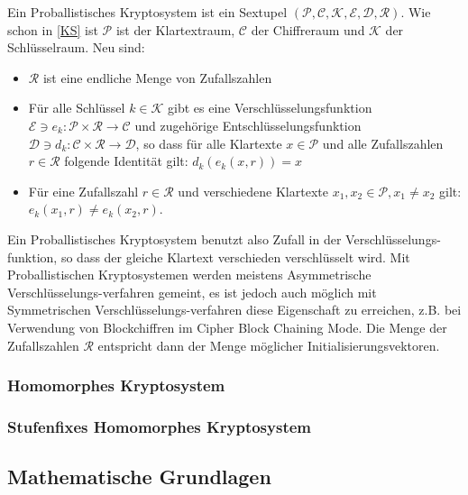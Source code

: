 \begin{theorem}
	\label{PKS}
	Ein Proballistisches Kryptosystem ist ein Sextupel $(\mathcal{P},\mathcal{C},\mathcal{K},\mathcal{E},\mathcal{D},\mathcal{R})$. Wie schon in \ref{KS} ist $\mathcal{P}$ ist der Klartextraum, $\mathcal{C}$ der Chiffreraum und $\mathcal{K}$ der Schlüsselraum. Neu sind:
	\begin{itemize}
		\item $\mathcal{R}$ ist eine endliche Menge von Zufallszahlen
		\item Für alle Schlüssel $k\in \mathcal{K}$ gibt es eine Verschlüsselungsfunktion $\mathcal{E}\ni e_k:\mathcal{P}\times\mathcal{R}\rightarrow\mathcal{C}$ und zugehörige Entschlüsselungsfunktion $\mathcal{D}\ni d_k:\mathcal{C}\times\mathcal{R}\rightarrow\mathcal{D}$, so dass für alle Klartexte $x\in\mathcal{P}$ und alle Zufallszahlen $r\in\mathcal{R}$ folgende Identität gilt: $d_k(e_k(x,r)) = x$ 
		\item Für eine Zufallszahl $r\in\mathcal{R}$ und verschiedene Klartexte $x_1,x_2\in\mathcal{P}, x_1\neq x_2$ gilt: $e_k(x_1,r)\neq e_k(x_2,r)$.
		
	\end{itemize}
\end{theorem}

Ein Proballistisches Kryptosystem benutzt also Zufall in der Verschlüsselungs-funktion, so dass der gleiche Klartext verschieden verschlüsselt wird. Mit Proballistischen Kryptosystemen werden meistens Asymmetrische Verschlüsselungs-verfahren gemeint, es ist jedoch auch möglich mit Symmetrischen Verschlüsselungs-verfahren diese Eigenschaft zu erreichen, z.B. bei Verwendung von Blockchiffren im Cipher Block Chaining Mode. Die Menge der Zufallszahlen $\mathcal{R}$ entspricht dann der Menge möglicher Initialisierungsvektoren. 




\subsubsection{Homomorphes Kryptosystem}

\subsubsection{Stufenfixes Homomorphes Kryptosystem}
\label{LHE}

\subsection{Mathematische Grundlagen}
\label{MG}

